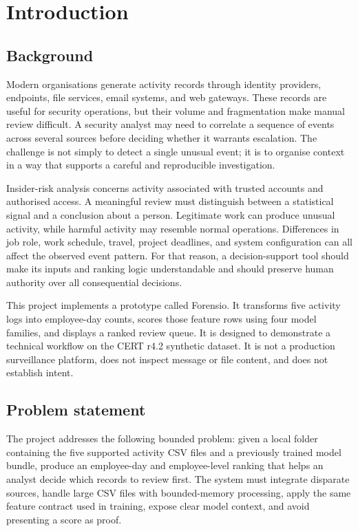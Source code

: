 \documentclass[12pt,a4paper,oneside]{report}
\begin{document}
\clearpage
{}
\setcounter{page}{1}
\pagestyle{reportstyle}
\onehalfspacing

\chapter{Introduction}
\label{chap:introduction}

\section{Background}
Modern organisations generate activity records through identity
providers, endpoints, file services, email systems, and web gateways.
These records are useful for security operations, but their volume and
fragmentation make manual review difficult. A security analyst may
need to correlate a sequence of events across several sources before
deciding whether it warrants escalation. The challenge is not simply
to detect a single unusual event; it is to organise context in a way
that supports a careful and reproducible investigation.

Insider-risk analysis concerns activity associated with trusted
accounts and authorised access. A meaningful review must distinguish
between a statistical signal and a conclusion about a person.
Legitimate work can produce unusual activity, while harmful activity
may resemble normal operations. Differences in job role, work schedule,
travel, project deadlines, and system configuration can all affect the
observed event pattern. For that reason, a decision-support tool should
make its inputs and ranking logic understandable and should preserve
human authority over all consequential decisions.

This project implements a prototype called Forensio. It transforms
five activity logs into employee-day counts, scores those feature rows
using four model families, and displays a ranked review queue. It is
designed to demonstrate a technical workflow on the CERT r4.2
synthetic dataset. It is not a production surveillance platform, does
not inspect message or file content, and does not establish intent.

\section{Problem statement}
The project addresses the following bounded problem: given a local
folder containing the five supported activity CSV files and a
previously trained model bundle, produce an employee-day and
employee-level ranking that helps an analyst decide which records to
review first. The system must integrate disparate sources, handle
large CSV files with bounded-memory processing, apply the same feature
contract used in training, expose clear model context, and avoid
presenting a score as proof.
\end{document}
